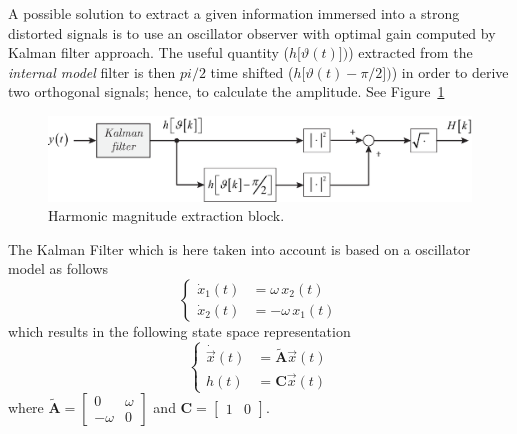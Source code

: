 \documentclass[11pt,a4paper,oneside]{book}
\numberwithin{equation}{section}
\theoremstyle{it}
\theoremstyle{definition}
\begin{document}
A possible solution to extract a given information immersed into a strong 
distorted signals is to use an oscillator observer with optimal gain computed 
by Kalman filter approach. The useful quantity ($h\big[\vartheta(t)\big])$) 
extracted from the \textit{internal model} filter is then $pi/2$ time shifted 
($h\big[\vartheta(t)-\pi/2\big])$) in order to derive two orthogonal signals; 
hence, to calculate the amplitude. See Figure~\ref{ctrl_layout_2}
\begin{figure}[H]
	\centering
	\includegraphics[width = 360pt, angle = 0, 
	keepaspectratio]{figures/shaker/ctrl_layout_2.eps}
	\captionsetup{width=0.5\textwidth, font=small}		
	\caption{Harmonic magnitude extraction block.}
	\label{ctrl_layout_2}
\end{figure}
The Kalman Filter which is here taken into account is based on a oscillator 
model as follows
\begin{equation}
	\left\lbrace 
	\begin{aligned}
		\dot{x}_1(t) &= \omega\,x_2(t) \\[6pt]
		\dot{x}_2(t) &= -\omega\,x_1(t)
	\end{aligned}\right. 
\end{equation} 
which results in the following state space representation
\begin{equation}
	\left\lbrace \begin{aligned}
		\dot{\vec{x}}(t) &= \tilde{\mathbf{A}}{\vec{x}}(t) \\[6pt]
		h(t) &= \mathbf{C}{\vec{x}}(t)
	\end{aligned}\right. 
\end{equation} 
where $\tilde{\mathbf{A}} = \begin{bmatrix} 0 & \omega \\ -\omega & 0 
\end{bmatrix}$ and $\mathbf{C} = \begin{bmatrix} 1 & 0 \end{bmatrix}$. 
\end{document}
